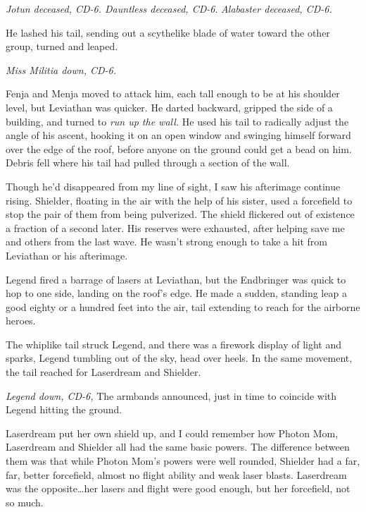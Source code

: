 \emph{Jotun deceased, CD-6.  Dauntless deceased, CD-6}.  \emph{Alabaster deceased, CD-6.}



He lashed his tail, sending out a scythelike blade of water toward the other group, turned and leaped.



\emph{Miss Militia down, CD-6.}



Fenja and Menja moved to attack him, each tall enough to be at his shoulder level, but Leviathan was quicker.  He darted backward, gripped the side of a building, and turned to \emph{run up the wall. } He used his tail to radically adjust the angle of his ascent, hooking it on an open window and swinging himself forward over the edge of the roof, before anyone on the ground could get a bead on him.  Debris fell where his tail had pulled through a section of the wall.



Though he'd disappeared from my line of sight, I saw his afterimage continue rising.  Shielder, floating in the air with the help of his sister, used a forcefield to stop the pair of them from being pulverized.  The shield flickered out of existence a fraction of a second later.  His reserves were exhausted, after helping save me and others from the last wave.  He wasn't strong enough to take a hit from Leviathan or his afterimage.



Legend fired a barrage of lasers at Leviathan, but the Endbringer was quick to hop to one side, landing on the roof's edge.  He made a sudden, standing leap a good eighty or a hundred feet into the air, tail extending to reach for the airborne heroes.



The whiplike tail struck Legend, and there was a firework display of light and sparks, Legend tumbling out of the sky, head over heels.  In the same movement, the tail reached for Laserdream and Shielder.



\emph{Legend down, CD-6,  }The armbands announced, just in time to coincide with Legend hitting the ground.



Laserdream put her own shield up, and I could remember how Photon Mom, Laserdream and Shielder all had the same basic powers.  The difference between them was that while Photon Mom's powers were well rounded, Shielder had a far, far, better forcefield, almost no flight ability and weak laser blasts.  Laserdream was the opposite\ldots her lasers and flight were good enough, but her forcefield, not so much.



